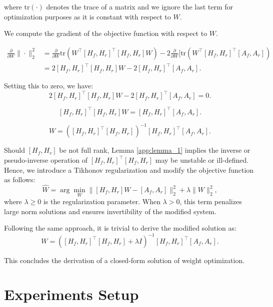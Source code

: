 where \( \text{tr}(\cdot) \) denotes the trace of a matrix and we ignore the last term for optimization purposes as it is constant with respect to \( W \). 

We compute the gradient of the objective function with respect to \( W \).

\begin{align*}
\frac{\partial}{\partial W} \| \cdot \|_2^2 
&= \frac{\partial}{\partial W} \text{tr} \left( W^\top [H_f, H_r]^\top [H_f, H_r] W \right) 
- 2 \frac{\partial}{\partial W} [ \text{tr} \left( W^\top [H_f, H_r]^\top [A_f, A_r] \right) \\[5pt]
&= 2 [H_f, H_r]^\top [H_f, H_r] W 
    - 2 [H_f, H_r]^\top [A_f, A_r].
\end{align*}

Setting this to zero, we have:
\[
2 [H_f, H_r]^\top [H_f, H_r] W - 2 [H_f, H_r]^\top [A_f, A_r] = 0.
\]

\[
[H_f, H_r]^\top [H_f, H_r] W = [H_f, H_r]^\top [A_f, A_r].
\]

\[
W = \left([H_f, H_r]^\top [H_f, H_r]\right)^{-1} [H_f, H_r]^\top [A_f, A_r].
\]

Should $[H_f, H_r]$ be not full rank, Lemma \ref{app:lemma_1} implies the inverse or pseudo-inverse operation of $[H_f, H_r]^\top [H_f, H_r]$ may be unstable or ill-defined. Hence, we introduce a Tikhonov regularization and modify the objective function as follows:
\[
\widehat{W} = \arg\min_{W} \|[H_f, H_r]W - [A_f, A_r]\|_2^2 + \lambda \|W\|_2^2,
\]
where $\lambda \geq 0$ is the regularization parameter. When $\lambda > 0$, this term penalizes large norm solutions and ensures invertibility of the modified system.

Following the same approach, it is trivial to derive the modified solution as:
\[
W = ([H_f, H_r]^\top [H_f, H_r] + \lambda I)^{-1}[H_f, H_r]^\top [A_f, A_r].
\]

This concludes the derivation of a closed-form solution of weight optimization.




\clearpage

\section{Experiments Setup}\label{app:exp_setup}

